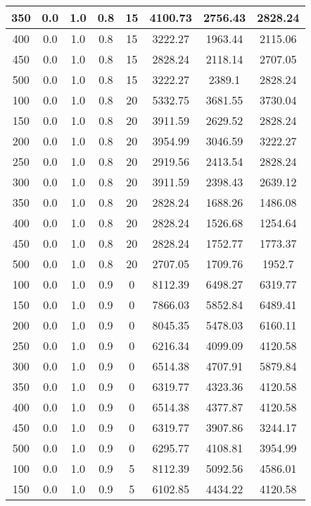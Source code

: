 \documentclass[a4paper, 12pt]{extreport}
\begin{document}
\begin{itemize}
\begin{longtable}{|c|c|c|c|c|c|c|c|}
			350 & 0.0 & 1.0 & 0.8 & 15 & 4100.73 & 2756.43 & 2828.24 \\\hline
			400 & 0.0 & 1.0 & 0.8 & 15 & 3222.27 & 1963.44 & 2115.06 \\\hline
			450 & 0.0 & 1.0 & 0.8 & 15 & 2828.24 & 2118.14 & 2707.05 \\\hline
			500 & 0.0 & 1.0 & 0.8 & 15 & 3222.27 & 2389.1 & 2828.24 \\\hline
			100 & 0.0 & 1.0 & 0.8 & 20 & 5332.75 & 3681.55 & 3730.04 \\\hline
			150 & 0.0 & 1.0 & 0.8 & 20 & 3911.59 & 2629.52 & 2828.24 \\\hline
			200 & 0.0 & 1.0 & 0.8 & 20 & 3954.99 & 3046.59 & 3222.27 \\\hline
			250 & 0.0 & 1.0 & 0.8 & 20 & 2919.56 & 2413.54 & 2828.24 \\\hline
			300 & 0.0 & 1.0 & 0.8 & 20 & 3911.59 & 2398.43 & 2639.12 \\\hline
			350 & 0.0 & 1.0 & 0.8 & 20 & 2828.24 & 1688.26 & 1486.08 \\\hline
			400 & 0.0 & 1.0 & 0.8 & 20 & 2828.24 & 1526.68 & 1254.64 \\\hline
			450 & 0.0 & 1.0 & 0.8 & 20 & 2828.24 & 1752.77 & 1773.37 \\\hline
			500 & 0.0 & 1.0 & 0.8 & 20 & 2707.05 & 1709.76 & 1952.7 \\\hline
			100 & 0.0 & 1.0 & 0.9 & 0 & 8112.39 & 6498.27 & 6319.77 \\\hline
			150 & 0.0 & 1.0 & 0.9 & 0 & 7866.03 & 5852.84 & 6489.41 \\\hline
			200 & 0.0 & 1.0 & 0.9 & 0 & 8045.35 & 5478.03 & 6160.11 \\\hline
			250 & 0.0 & 1.0 & 0.9 & 0 & 6216.34 & 4099.09 & 4120.58 \\\hline
			300 & 0.0 & 1.0 & 0.9 & 0 & 6514.38 & 4707.91 & 5879.84 \\\hline
			350 & 0.0 & 1.0 & 0.9 & 0 & 6319.77 & 4323.36 & 4120.58 \\\hline
			400 & 0.0 & 1.0 & 0.9 & 0 & 6514.38 & 4377.87 & 4120.58 \\\hline
			450 & 0.0 & 1.0 & 0.9 & 0 & 6319.77 & 3907.86 & 3244.17 \\\hline
			500 & 0.0 & 1.0 & 0.9 & 0 & 6295.77 & 4108.81 & 3954.99 \\\hline
			100 & 0.0 & 1.0 & 0.9 & 5 & 8112.39 & 5092.56 & 4586.01 \\\hline
			150 & 0.0 & 1.0 & 0.9 & 5 & 6102.85 & 4434.22 & 4120.58 \\\hline

\end{longtable}
\end{itemize}
\end{document}
